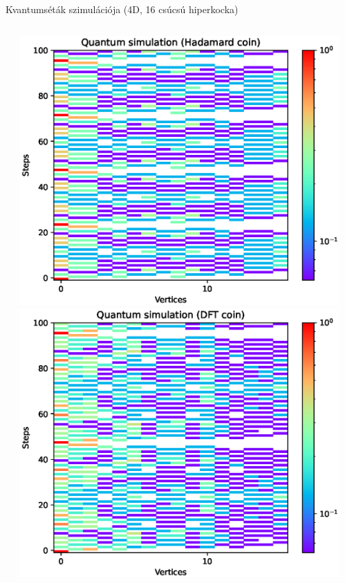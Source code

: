 \documentclass[aspectratio=169]{beamer}
\begin{document}
\begin{frame}{Kvantumséták szimulációja (4D, 16 csúcsú hiperkocka)}
\begin{columns}
\begin{column}{0.30\linewidth}
\begin{center}
\end{center}
\end{column}
\begin{column}{0.30\linewidth}
\begin{center}
\includegraphics[width=\linewidth]{./cikk_figures/results/hypercube/hadamard.eps}
\newline
\includegraphics[width=\linewidth]{./cikk_figures/results/hypercube/dft.eps}
\end{center}
\end{column}
\begin{column}{0.20\linewidth}
\end{column}
\end{columns}



\end{frame}
\end{document}
